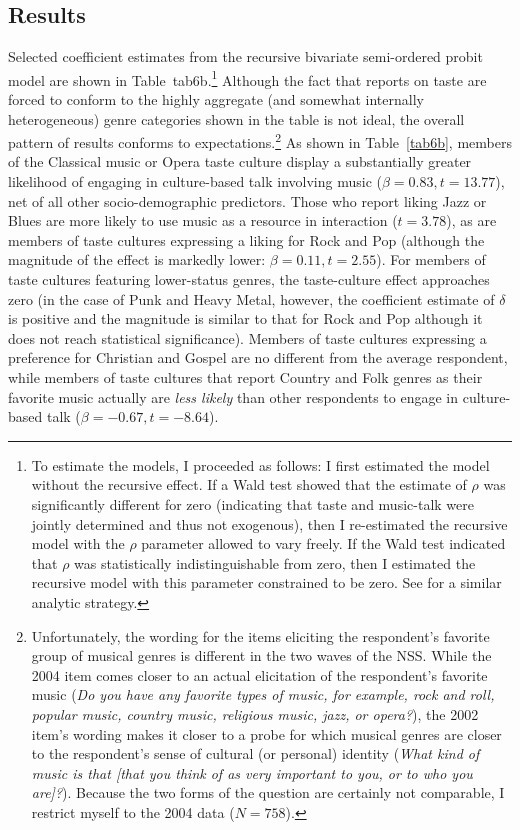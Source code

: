 \documentclass[11pt]{article}
\begin{document}
\subsection{Results}
Selected coefficient estimates from the recursive bivariate semi-ordered probit model are shown in Table~{tab6b}.\footnote{To estimate the models, I proceeded as follows:  I first estimated the model without the recursive effect.  If a Wald test showed that the estimate of $\rho$ was significantly different for zero (indicating that taste and music-talk were jointly determined and thus not exogenous), then I re-estimated the recursive model with the $\rho$ parameter allowed to vary freely.  If the Wald test indicated that $\rho$ was statistically indistinguishable from zero, then I estimated the recursive model with this parameter constrained to be zero. See \citet{greene98} for a similar analytic strategy.} Although the fact that reports on taste are forced to conform to the highly aggregate (and somewhat internally heterogeneous) genre categories shown in the table is not ideal, the overall pattern of results conforms to expectations.\footnote{Unfortunately, the wording for the items eliciting the respondent's favorite group of musical genres is different in the two waves of the NSS. While the 2004 item comes closer to an actual elicitation  of the respondent's favorite music (\emph{Do you have any favorite types of music, for example, rock and roll, popular music, country music, religious music, jazz, or opera?}), the 2002 item's wording makes it closer to a probe for which musical genres are closer to the respondent's sense of cultural (or personal) identity (\emph{What kind of music is that [that you think of as very important to you, or to who you are]?}).  Because the two forms of the question are certainly not  comparable, I restrict myself to the 2004 data ($N=758$).}  As shown in Table~\ref{tab6b}, members of the Classical music or Opera taste culture display a substantially greater likelihood of engaging in culture-based talk involving music ($\beta=0.83, t=13.77$), net of all other socio-demographic predictors.  Those who report liking Jazz or Blues are more likely to use music as a resource in interaction  ($t=3.78$), as are members of taste cultures expressing a liking for Rock and Pop (although the magnitude of the effect is markedly lower: $\beta=0.11, t=2.55$).   For members of taste cultures featuring lower-status genres, the taste-culture effect approaches zero (in the case of Punk and Heavy Metal, however, the coefficient estimate of $\delta$ is positive and the magnitude is similar to that for Rock and Pop although it does not reach statistical significance).  Members of taste cultures expressing a preference for Christian and Gospel are no different from the average respondent, while members of taste cultures that report Country and Folk genres as their favorite music actually are \emph{less likely} than other respondents to engage in culture-based talk ($\beta=-0.67, t=-8.64$).   
\end{document}
